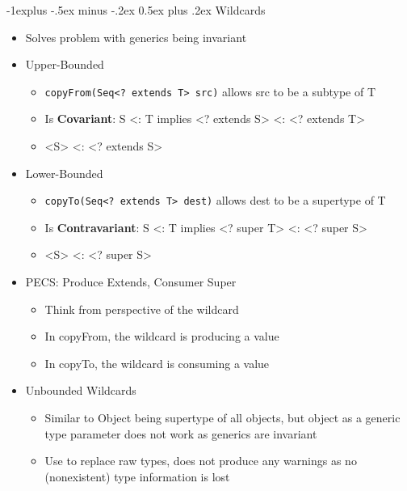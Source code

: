 \documentclass[10pt, landscape]{article}
\makeatletter
\renewcommand{\section}{\@startsection{section}{1}{0mm}%
                                {-1ex plus -.5ex minus -.2ex}%
                                {0.5ex plus .2ex}%
                                {\normalfont\large\bfseries}}
\renewcommand{\section}{\@startsection{section}{2}{0mm}%
                                {-1explus -.5ex minus -.2ex}%
                                {0.5ex plus .2ex}%
                                {\normalfont\normalsize\bfseries}}
\makeatother
\begin{document}
\begin{multicols*}{4}
\section{Wildcards}
\begin{itemize}
    \item Solves problem with generics being invariant
    \item Upper-Bounded
    \begin{itemize}
        \item \lstinline{copyFrom(Seq<? extends T> src)} allows src to be a subtype of T
        \item Is \textbf{Covariant}: S <: T implies <? extends S> <: <? extends T>
        \item <S> <: <? extends S>
    \end{itemize}
    \item Lower-Bounded
    \begin{itemize}
        \item \lstinline{copyTo(Seq<? extends T> dest)} allows dest to be a supertype of T
        \item Is \textbf{Contravariant}: S <: T implies <? super T> <: <? super S>
        \item <S> <: <? super S>
    \end{itemize}
    \item PECS: Produce Extends, Consumer Super
    \begin{itemize}
        \item Think from perspective of the wildcard
        \item In copyFrom, the wildcard is producing a value
        \item In copyTo, the wildcard is consuming a value
    \end{itemize}
    \item Unbounded Wildcards
    \begin{itemize}
        \item Similar to Object being supertype of all objects, but object as a generic type parameter does not work as generics are invariant
        \item Use to replace raw types, does not produce any warnings as no (nonexistent) type information is lost
    \end{itemize}
\end{itemize}


\end{multicols*}
\end{document}
